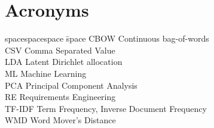 \section*{Acronyms}

\begin{tabbing}
spacespacespace \= space \kill
CBOW \> Continuous bag-of-words \\
CSV \> Comma Separated Value \\
LDA	\>	Latent Dirichlet allocation \\
ML \> Machine Learning\\
PCA \> Principal Component Analysis\\
RE	\>	Requirements Engineering \\
TF-IDF \> Term Frequency, Inverse Document Frequency \\
WMD \> Word Mover's Distance\\
\end{tabbing}